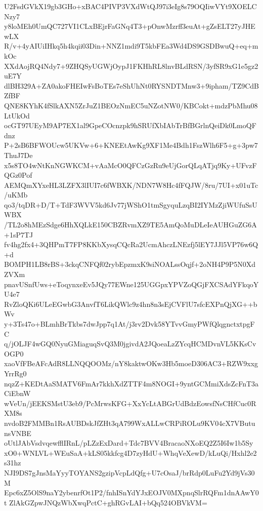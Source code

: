 U2FsdGVkX19gb3GHo+xBAC4PIVP3VXdWtQJ97i3eIg8s79OQIiwVYt9XOELCNzy7
y8loMEh0UmQC727VI1CLxBEjrFaGNq4T3+pOnwMzrff3euAt+gZsELT27yJHEwLX
R/v+4yAIUiIHkq5h4kqii03Din+NNZ1mdi9T5kbFEa3Wd4DS9GSDBwuQ+eq+mkOc
XXdAojRQ4Ndy7+9ZHQSyUGWjOypJ1FKHhRL8lnvBLdRSN/3yfSR9xG1e5gz2uE7Y
dlBH329A+ZA0akoFHEIwFsBoTEs7eShUhNt0RYSNDTMnw3+9ipham/TZ9CdBZfBF
QNE8KYhK4fSlkAXN5ZrJuZ1BEOzNmEC5uNZotNW0/KBCokt+mdzPbMhu08LtUkOd
ocGT97UEyM9AP7EX1al9GpeCOcnzpk9hSRUfXbIAbTrBfBGrlnQeiDk0LmoQFdnz
P+2sB6BFWOUcw5UKVw+6+KNEEtAwKg9XF1Me4Bdh1FszWlh6F5+g+3pw7ThuJ7De
x5s8TO4wNtKnNGWKCM+vAaMcO0QFCzGzRu9eUjGorQLqATjq9Ky+UFvzFQGz0Pof
AEMQmXYxeHL3LZFX3lIUI7c6fWBXK/NDN7W8Hc4fFQJW/8ru/7UI+x01uTc/uKMb
qo3/tqDR+D/T+TdF3WVV5kd6Jv77jWShO1tmSgyquLzqBI2IYMzZjiWUfuSsUWBX
/TL2o8hMEzSdge6HhXQLkE150CBZRvmXZ9TE5AmQoMuDLeIeAUHGuZG6A+1sP7TJ
fv4hg2fx4+3QHPmT7FP8KKbXysqCQcRa2UcmAhczLNEzfj5lEY7JJl5VP76w6Q+d
BOMPH1LB8rBS+3ckqCNFQf02rybEpzmxK9siNOALssOqjf+2oNH4P9P5N0XdZVXm
pnavUSnfUws+eToqynxeEv5JQy77EWne125UGGpxYPVZoQGjFXCSAdYFkqoYU4e7
RvZloQKi6ULeEGwbG3AnvfT6LikQWlc9z4hn8n3sEjCVFlU7sfcEXPnQjXG++bWv
y+3Ts47o+BLmhBrTkbs7dwJpp7q1At/j3rv2Dvk58YTvvGmyPWfQlqgnctxtpgFC
q/jOLJF4wGQ0NyuGMiaguqSvQ3M0jgivdA2JQoeaLzZYcqHCMDvnVL5KKsCvOGP0
xaoVfFBeAFcAdR8LLNQQOOMz/nY8kaktwOKw3Hb5moeD306AC3+RZW9xxgYrrRg0
nqzZ+KEDtAaSMATV6FmAr7kkhXdZTTF4m8NOGI+9yntGCMmiXdsZcFnT3aCiEbnW
wVeUn/jEEKSMstU3eb9/PcMrwsKFG+XxYcLtABGrUdBdzEowsfNsCHfCuc0RXM8s
nvdoB2FMMBn1RsAUBDskJfZHt3qA799WxALLwCRPiROLu9KV04cX7VButunsVNBE
oUtlJAbVsdvqewfflIRnL/pLZzExDard+Tdc7BVV4BracaoNXoEQ2Z5I6Iw1b5Sy
xO0+WNLVL+WEuSaA+kLS05kkfcg4D7zyHdU+WhqVeXewD/kLuQi/Hxhl2e2s31hz
NJI9DS7gJnsMaYyyTOYANS2gzipVcpLdQfg+U7cOsaJ/brRdp0LuFu2Yd9jVs30M
Epc6xZ5OlS9naY2ybenrfOt1P2/fnhISnYdYJxEOJV0MXpnqSlrRQFm1dnAAwY0t
ZlAkGZpwJNQzWbXwqPctC+ghRGvLAI+bQq524OBVkVM=
